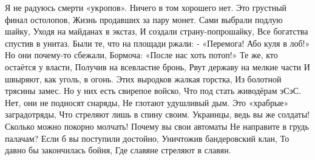 Я не радуюсь смерти «укропов».
Ничего в том хорошего нет.
Это грустный финал остолопов,
Жизнь продавших за пару монет.
Сами выбрали подлую шайку,
Уходя на майданах в экстаз,
И создали страну-попрошайку,
Все богатства спустив в унитаз.
Были те, что на площади ржали:
- «Перемога! Або куля в лоб!»
Но они почему-то сбежали,
Бормоча: «После нас хоть потоп!»
Те же, кто остаётся у власти,
Получив на всевластие бронь,
Рвут державу на мелкие части
И швыряют, как уголь, в огонь.
Этих выродков жалкая горстка,
Из болотной трясины замес.
Но у них есть свирепое войско,
Что под стать живодёрам эСэС.
Нет, они не подносят снаряды,
Не глотают удушливый дым.
Это «храбрые» заградотряды,
Что стреляют лишь в спину своим.
Украинцы, ведь вы же солдаты!
Сколько можно покорно молчать!
Почему вы свои автоматы
Не направите в грудь палачам?
Если б вы поступили достойно,
Уничтожив бандеровский клан,
То давно бы закончилась бойня,
Где славяне стреляют в славян.

